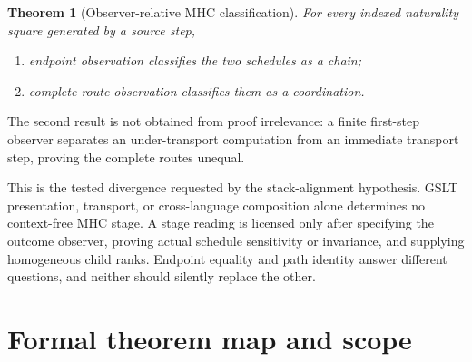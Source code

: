 \documentclass[11pt]{article}
\newtheorem{theorem}[definition]{Theorem}
\theoremstyle{remark}
\begin{document}
\begin{theorem}[Observer-relative MHC classification]
For every indexed naturality square generated by a source step,
\begin{enumerate}[label=(\alph*)]
  \item endpoint observation classifies the two schedules as a chain;
  \item complete route observation classifies them as a coordination.
\end{enumerate}
\end{theorem}

The second result is not obtained from proof irrelevance: a finite first-step
observer separates an under-transport computation from an immediate transport
step, proving the complete routes unequal.

This is the tested divergence requested by the stack-alignment hypothesis.
GSLT presentation, transport, or cross-language composition alone determines
no context-free MHC stage.  A stage reading is licensed only after specifying
the outcome observer, proving actual schedule sensitivity or invariance, and
supplying homogeneous child ranks.  Endpoint equality and path identity answer
different questions, and neither should silently replace the other.

\section{Formal theorem map and scope}
\end{document}
